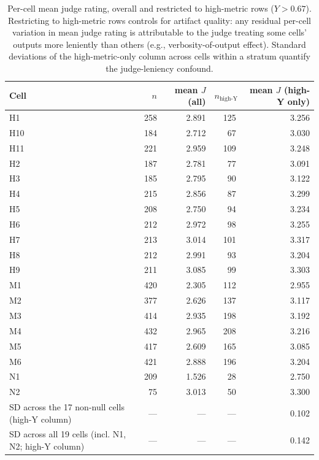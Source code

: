 \begin{table}[!htbp]
\centering
\small
\caption{Per-cell mean judge rating, overall and restricted to high-metric rows ($Y > 0.67$). Restricting to high-metric rows controls for artifact quality: any residual per-cell variation in mean judge rating is attributable to the judge treating some cells' outputs more leniently than others (e.g., verbosity-of-output effect). Standard deviations of the high-metric-only column across cells within a stratum quantify the judge-leniency confound.}
\label{tab:judge_leniency}
\begin{tabular}{@{}lrrrr@{}}
\toprule
Cell & $n$ & mean $J$ (all) & $n_{\text{high-Y}}$ & mean $J$ (high-Y only) \\
\midrule
H1 & 258 & 2.891 & 125 & 3.256 \\
H10 & 184 & 2.712 & 67 & 3.030 \\
H11 & 221 & 2.959 & 109 & 3.248 \\
H2 & 187 & 2.781 & 77 & 3.091 \\
H3 & 185 & 2.795 & 90 & 3.122 \\
H4 & 215 & 2.856 & 87 & 3.299 \\
H5 & 208 & 2.750 & 94 & 3.234 \\
H6 & 212 & 2.972 & 98 & 3.255 \\
H7 & 213 & 3.014 & 101 & 3.317 \\
H8 & 212 & 2.991 & 93 & 3.204 \\
H9 & 211 & 3.085 & 99 & 3.303 \\
M1 & 420 & 2.305 & 112 & 2.955 \\
M2 & 377 & 2.626 & 137 & 3.117 \\
M3 & 414 & 2.935 & 198 & 3.192 \\
M4 & 432 & 2.965 & 208 & 3.216 \\
M5 & 417 & 2.609 & 165 & 3.085 \\
M6 & 421 & 2.888 & 196 & 3.204 \\
N1 & 209 & 1.526 & 28 & 2.750 \\
N2 & 75 & 3.013 & 50 & 3.300 \\
\midrule
SD across the 17 non-null cells (high-Y column) & --- & --- & --- & 0.102 \\
SD across all 19 cells (incl. N1, N2; high-Y column) & --- & --- & --- & 0.142 \\
\bottomrule
\end{tabular}
\end{table}
